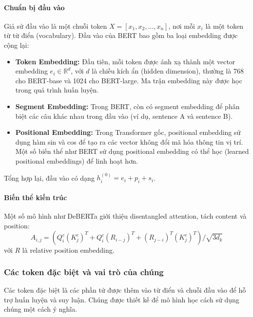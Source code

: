 \paragraph{Chuẩn bị đầu vào}
Giả sử đầu vào là một chuỗi token $X = [x_1, x_2, \dots, x_n]$, nơi mỗi $x_i$ là một token từ từ điển (vocabulary). Đầu vào của BERT bao gồm ba loại embedding được cộng lại:
\begin{itemize}
	\item \textbf{Token Embedding:} Đầu tiên, mỗi token được ánh xạ thành một vector embedding $e_i \in \mathbb{R}^d$, với $d$ là chiều kích ẩn (hidden dimension), thường là 768 cho BERT-base và 1024 cho BERT-large. Ma trận embedding này được học trong quá trình huấn luyện.
	\item \textbf{Segment Embedding:} Trong BERT, còn có segment embedding để phân biệt các câu khác nhau trong đầu vào (ví dụ, sentence A và sentence B).
	\item \textbf{Positional Embedding:} Trong Transformer gốc, positional embedding sử dụng hàm sin và cos để tạo ra các vector không đổi mã hóa thông tin vị trí. Một số biến thể như BERT sử dụng positional embedding có thể học (learned positional embeddings) để linh hoạt hơn.
\end{itemize}
Tổng hợp lại, đầu vào có dạng $h_i^{(0)} = e_i + p_i + s_i$.


\paragraph{Biến thể kiến trúc}
Một số mô hình như DeBERTa giới thiệu disentangled attention, tách content và position:
\[
A_{i,j} = (Q_i^c (K_j^c)^T + Q_i^c (R_{i-j})^T + (R_{j-i})^T (K_j^c)^T) / \sqrt{3 d_k}
\]
với $R$ là relative position embedding.

\subsubsection{Các token đặc biệt và vai trò của chúng}
Các token đặc biệt là các phần tử được thêm vào từ điển và chuỗi đầu vào để hỗ trợ huấn luyện và suy luận. Chúng được thiết kế để mô hình học cách sử dụng chúng một cách ý nghĩa.

